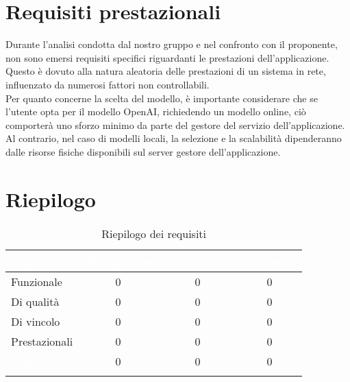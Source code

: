 \section{Requisiti prestazionali}
Durante l'analisi condotta dal nostro gruppo e nel confronto con il proponente, non sono emersi requisiti specifici riguardanti le prestazioni dell'applicazione. Questo è dovuto alla natura aleatoria delle prestazioni di un sistema in rete, influenzato da numerosi fattori non controllabili.\\Per quanto concerne la scelta del modello, è importante considerare che se l'utente opta per il modello OpenAI, richiedendo un modello online, ciò comporterà uno sforzo minimo da parte del gestore del servizio dell'applicazione. Al contrario, nel caso di modelli locali, la selezione e la scalabilità dipenderanno dalle risorse fisiche disponibili sul server gestore dell'applicazione.

\section{Riepilogo}
\begingroup
\setlength{\tabcolsep}{10pt}
\renewcommand{\arraystretch}{1.5}
\begin{xltabular}{\textwidth}{| X | c | c | c |}
    \hline
     \textbf{\textcolor{white}{Requisito}} & \textbf{\textcolor{white}{Obbligatorio}} & \textbf{\textcolor{white}{Desiderabile}} & \textbf{\textcolor{white}{Opzionale}}\\
    \hline
    \endhead
    Funzionale & 0 & 0 & 0 \\
    \hline
    Di qualità & 0 & 0 & 0 \\
    \hline
    Di vincolo & 0 & 0 & 0 \\
    \hline
    Prestazionali & 0 & 0 & 0 \\
    \hline
     \textbf{\textcolor{white}{Totale}} & 0 & 0 & 0 \\
    \hline
    
     \caption{Riepilogo dei requisiti}
    \label{tab:riepilogo}
\end{xltabular}
\endgroup
